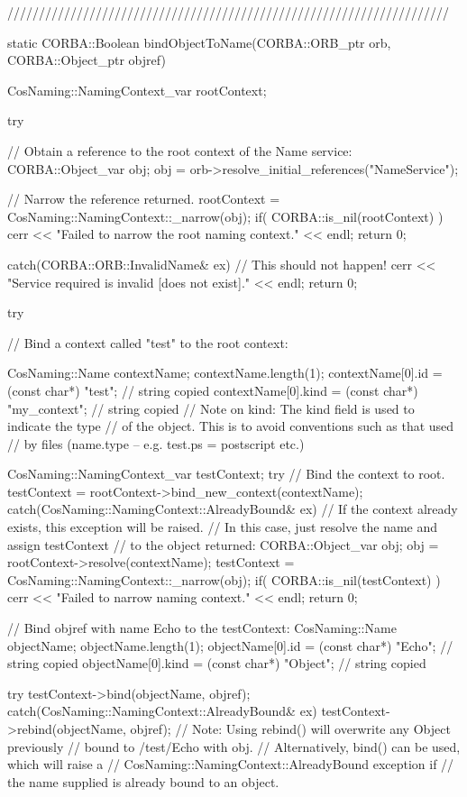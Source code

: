 \documentclass[11pt,twoside,a4paper]{book}
\begin{document}
\begin{cxxlisting}
//////////////////////////////////////////////////////////////////////

static CORBA::Boolean
bindObjectToName(CORBA::ORB_ptr orb, CORBA::Object_ptr objref)
{
  CosNaming::NamingContext_var rootContext;

  try {
    // Obtain a reference to the root context of the Name service:
    CORBA::Object_var obj;
    obj = orb->resolve_initial_references("NameService");

    // Narrow the reference returned.
    rootContext = CosNaming::NamingContext::_narrow(obj);
    if( CORBA::is_nil(rootContext) ) {
      cerr << "Failed to narrow the root naming context." << endl;
      return 0;
    }
  }
  catch(CORBA::ORB::InvalidName& ex) {
    // This should not happen!
    cerr << "Service required is invalid [does not exist]." << endl;
    return 0;
  }

  try {
    // Bind a context called "test" to the root context:

    CosNaming::Name contextName;
    contextName.length(1);
    contextName[0].id   = (const char*) "test";       // string copied
    contextName[0].kind = (const char*) "my_context"; // string copied
    // Note on kind: The kind field is used to indicate the type
    // of the object. This is to avoid conventions such as that used
    // by files (name.type -- e.g. test.ps = postscript etc.)

    CosNaming::NamingContext_var testContext;
    try {
      // Bind the context to root.
      testContext = rootContext->bind_new_context(contextName);
    }
    catch(CosNaming::NamingContext::AlreadyBound& ex) {
      // If the context already exists, this exception will be raised.
      // In this case, just resolve the name and assign testContext
      // to the object returned:
      CORBA::Object_var obj;
      obj = rootContext->resolve(contextName);
      testContext = CosNaming::NamingContext::_narrow(obj);
      if( CORBA::is_nil(testContext) ) {
        cerr << "Failed to narrow naming context." << endl;
        return 0;
      }
    }

    // Bind objref with name Echo to the testContext:
    CosNaming::Name objectName;
    objectName.length(1);
    objectName[0].id   = (const char*) "Echo";   // string copied
    objectName[0].kind = (const char*) "Object"; // string copied

    try {
      testContext->bind(objectName, objref);
    }
    catch(CosNaming::NamingContext::AlreadyBound& ex) {
      testContext->rebind(objectName, objref);
    }
    // Note: Using rebind() will overwrite any Object previously
    //       bound to /test/Echo with obj.
    //       Alternatively, bind() can be used, which will raise a
    //       CosNaming::NamingContext::AlreadyBound exception if
    //       the name supplied is already bound to an object.

}}
\end{cxxlisting}
\end{document}
